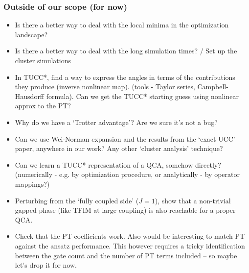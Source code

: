 \documentclass[10pt, a4paper]{article}
\begin{document}
\subsubsection*{Outside of our scope (for now)}
\begin{itemize}

\item Is there a better way to deal with the local minima in the optimization landscape?
\item Is there a better way to deal with the long simulation times? / Set up the cluster simulations
\item In TUCC*, find a way to express the angles in terms of the contributions they produce (inverse nonlinear map). (tools - Taylor series, Campbell-Hausdorff formula). Can we get the TUCC* starting guess using nonlinear approx to the PT?
\item Why do we have a `Trotter advantage'? Are we sure it's not a bug?
\item Can we use Wei-Norman expansion and the results from the `exact UCC' paper, anywhere in our work? Any other `cluster analysis' technique?

\item Can we learn a TUCC* representation of a QCA, somehow directly? (numerically - e.g. by optimization procedure, or analytically - by operator mappings?)

\item Perturbing from the `fully coupled side' ($J=1$), show that a non-trivial gapped phase (like TFIM at large coupling) is also reachable for a proper QCA.

\item Check that the PT coefficients work. Also would be interesting to match PT against the ansatz performance. This however requires a tricky identification between the gate count and the number of PT terms included -- so maybe let's drop it for now.


\end{itemize}
\end{document}
